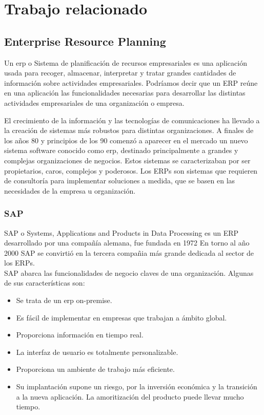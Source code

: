 \chapter{Trabajo relacionado}


\section[ERP's]{Enterprise Resource Planning}

Un \gls{erp} o Sistema de planificación de recursos empresariales es una aplicación usada para recoger, almacenar,
interpretar y tratar grandes cantidades de información sobre actividades empresariales.
Podríamos decir que un ERP reúne en una aplicación las funcionalidades necesarias para desarrollar las distintas actividades empresariales de una organización o empresa.

El crecimiento de la información y las tecnologías de comunicaciones ha llevado a la creación de sistemas más robustos para 
distintas organizaciones. A finales de los años 80 y principios de los 90 comenzó a aparecer en el mercado un nuevo sistema 
software conocido como \acrshort{erp}, destinado principalmente a grandes y complejas organizaciones de negocios. Estos sistemas 
se caracterizaban por ser propietarios, caros, complejos y poderosos.
Los ERPs son sistemas que requieren de consultoría para implementar soluciones a medida, que se basen en las necesidades de la empresa u organización. \cite{erp1}


\subsection{SAP}


SAP o  Systems, Applications and Products in Data Processing es un ERP desarrollado por una compañía alemana, fue fundada en 1972
En torno al año 2000 SAP se convirtió en la tercera compañia más grande dedicada al sector de los ERPs.\\

SAP abarca las funcionalidades de negocio claves de una organización. Algunas de sus características son:
\begin{itemize}
	\item Se trata de un \acrshort{erp} \gls{on-premise}.
	\item Es fácil de implementar en empresas que trabajan a ámbito global.
	\item Proporciona información en tiempo real.
	\item La interfaz de usuario es totalmente personalizable.
	\item Proporciona un ambiente de trabajo más eficiente.
	
	\item Su implantación supone un riesgo, por la inversión económica y la transición a la nueva aplicación. La amoritización del producto puede llevar mucho tiempo.
\end{itemize}

